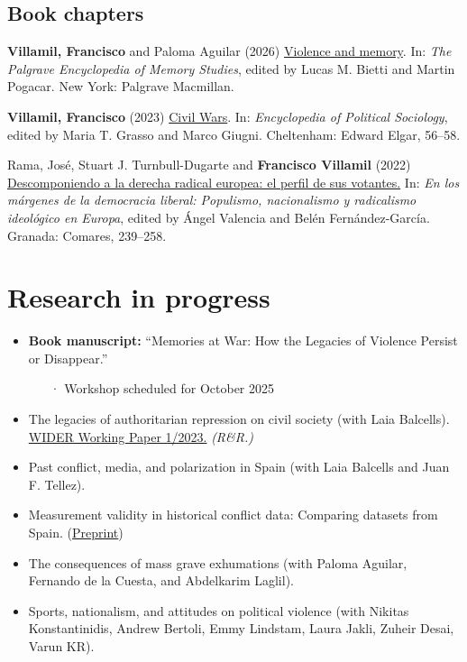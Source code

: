 \documentclass[a4paper, 12pt]{article}
\begin{document}
\subsection*{Book chapters}

\begin{etaremune}[leftmargin=12pt, itemsep=0pt]
\item \textbf{Villamil, Francisco} and Paloma Aguilar (2026) \href{https://doi.org/10.1007/978-3-030-93789-8_49-1}{Violence and memory}. In: \textit{The Palgrave Encyclopedia of Memory Studies}, edited by Lucas M. Bietti and Martin Pogacar. New York: Palgrave Macmillan. %
\item \textbf{Villamil, Francisco} (2023) \href{https://doi.org/10.4337/9781803921235.00020}{Civil Wars}. In: \textit{Encyclopedia of Political Sociology}, edited by Maria T. Grasso and Marco Giugni. Cheltenham: Edward Elgar, 56--58. %
\item Rama, José, Stuart J. Turnbull-Dugarte and \textbf{Francisco Villamil} (2022) \href{https://www.comares.com/libro/en-los-margenes-de-la-democracia-liberal_143816/}{Descomponiendo a la derecha radical europea: el perfil de sus votantes.} In: \textit{En los márgenes de la democracia liberal: Populismo, nacionalismo y radicalismo ideológico en Europa}, edited by Ángel Valencia and Belén Fernández-García. Granada: Comares, 239--258. %
\end{etaremune}

\section*{Research in progress}

\begin{itemize}[leftmargin=*, nolistsep]
\item \textbf{Book manuscript:} ``Memories at War: How the Legacies of Violence Persist or Disappear.''
\begin{itemize}
	\item[·] Workshop scheduled for October 2025
\end{itemize}
\item The legacies of authoritarian repression on civil society (with Laia Balcells).\\\href{https://doi.org/10.35188/UNU-WIDER/2023/309-3}{WIDER Working Paper 1/2023.} \textit{(R\&R.)}
\item Past conflict, media, and polarization in Spain (with Laia Balcells and Juan F. Tellez).
\item Measurement validity in historical conflict data: Comparing datasets from Spain. (\href{https://osf.io/c6wgk/}{Preprint})
\item The consequences of mass grave exhumations (with Paloma Aguilar, Fernando de la Cuesta, and Abdelkarim Laglil).
\item Sports, nationalism, and attitudes on political violence (with Nikitas Konstantinidis, Andrew Bertoli, Emmy Lindstam, Laura Jakli, Zuheir Desai, Varun KR).
\end{itemize}
\end{document}
